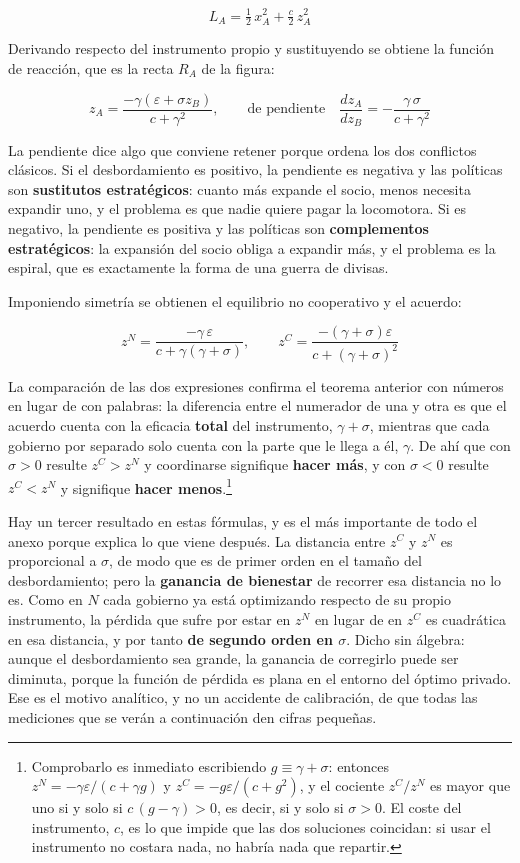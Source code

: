 \documentclass[10pt,a4paper]{article}
\newcounter{anexo}
\begin{document}
$$L_{A}=\tfrac12\,x_{A}^{2}+\tfrac{c}{2}\,z_{A}^{2}$$

Derivando respecto del instrumento propio y sustituyendo se obtiene la función de reacción, que es la recta $R_A$ de la figura:

$$z_{A}=\frac{-\gamma\left(\varepsilon+\sigma z_{B}\right)}{c+\gamma^{2}},\qquad\text{de pendiente}\quad \frac{dz_{A}}{dz_{B}}=-\frac{\gamma\,\sigma}{c+\gamma^{2}}$$

La pendiente dice algo que conviene retener porque ordena los dos conflictos clásicos. Si el desbordamiento es positivo, la pendiente es negativa y las políticas son \textbf{sustitutos estratégicos}: cuanto más expande el socio, menos necesita expandir uno, y el problema es que nadie quiere pagar la locomotora. Si es negativo, la pendiente es positiva y las políticas son \textbf{complementos estratégicos}: la expansión del socio obliga a expandir más, y el problema es la espiral, que es exactamente la forma de una guerra de divisas.

Imponiendo simetría se obtienen el equilibrio no cooperativo y el acuerdo:

$$z^{N}=\frac{-\gamma\,\varepsilon}{c+\gamma\left(\gamma+\sigma\right)},\qquad z^{C}=\frac{-\left(\gamma+\sigma\right)\varepsilon}{c+\left(\gamma+\sigma\right)^{2}}$$

La comparación de las dos expresiones confirma el teorema anterior con números en lugar de con palabras: la diferencia entre el numerador de una y otra es que el acuerdo cuenta con la eficacia \textbf{total} del instrumento, $\gamma+\sigma$, mientras que cada gobierno por separado solo cuenta con la parte que le llega a él, $\gamma$. De ahí que con $\sigma>0$ resulte $z^{C}>z^{N}$ y coordinarse signifique \textbf{hacer más}, y con $\sigma<0$ resulte $z^{C}<z^{N}$ y signifique \textbf{hacer menos}.\footnote{%
    Comprobarlo es inmediato escribiendo $g\equiv\gamma+\sigma$: entonces $z^{N}=-\gamma\varepsilon/(c+\gamma g)$ y $z^{C}=-g\varepsilon/(c+g^{2})$, y el cociente $z^{C}/z^{N}$ es mayor que uno si y solo si $c\,(g-\gamma)>0$, es decir, si y solo si $\sigma>0$. El coste del instrumento, $c$, es lo que impide que las dos soluciones coincidan: si usar el instrumento no costara nada, no habría nada que repartir.
}

Hay un tercer resultado en estas fórmulas, y es el más importante de todo el anexo porque explica lo que viene después. La distancia entre $z^{C}$ y $z^{N}$ es proporcional a $\sigma$, de modo que es de primer orden en el tamaño del desbordamiento; pero la \textbf{ganancia de bienestar} de recorrer esa distancia no lo es. Como en $N$ cada gobierno ya está optimizando respecto de su propio instrumento, la pérdida que sufre por estar en $z^{N}$ en lugar de en $z^{C}$ es cuadrática en esa distancia, y por tanto \textbf{de segundo orden en $\sigma$}. Dicho sin álgebra: aunque el desbordamiento sea grande, la ganancia de corregirlo puede ser diminuta, porque la función de pérdida es plana en el entorno del óptimo privado. Ese es el motivo analítico, y no un accidente de calibración, de que todas las mediciones que se verán a continuación den cifras pequeñas.
\end{document}

